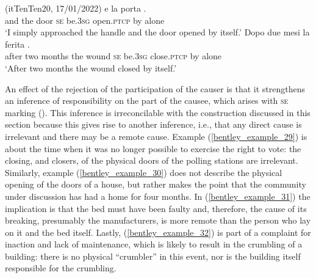 \documentclass[output=paper,colorlinks,citecolor=brown
]{langscibook}
\begin{document}
\hspace*{\fill}(itTenTen20, 17/01/2022)\quad
\ea \label{bentley_example_33}
    \ea \label{bentley_example_33a}
     	e				la		porta														 .	\\
    {} and	the	door		\textsc{se}		be.3\textsc{sg}		open.\textsc{ptcp}	by	alone \\
    \glt 					‘I simply approached the handle and the door opened by itself.’
    \ex \label{bentley_example_33b}
    \gll Dopo		due	mesi			la		ferita			 								 			 . \\
				after			two	months	the	wound		\textsc{se}		be.3\textsc{sg}		close.\textsc{ptcp}	by	alone\\
    \glt 				‘After two months the wound closed by itself.’
    \z
\z

An effect of the rejection of the participation of the causer is that it strengthens an inference of responsibility on the part of the causee, which arises with \textsc{se} marking (\cites[and references therein]{zribi1987reflexivite}[]{kailuweit2012construcciones}[see section \ref{bentley_section_5.4.1} for further discussion]{martin2014anticausatives}). This inference is irreconcilable with the construction discussed in this section because this gives rise to another inference, i.e., that any direct cause is irrelevant and there may be a remote cause. Example (\ref{bentley_example_29}) is about the time when it was no longer possible to exercise the right to vote: the closing, and closers, of the physical doors of the polling stations are irrelevant. Similarly, example (\ref{bentley_example_30}) does not describe the physical opening of the doors of a house, but rather makes the point that the community under discussion has had a home for four months. In (\ref{bentley_example_31}) the implication is that the bed must have been faulty and, therefore, the cause of its breaking, presumably the manufacturers, is more remote than the person who lay on it and the bed itself. Lastly, (\ref{bentley_example_32}) is part of a complaint for inaction and lack of maintenance, which is likely to result in the crumbling of a building: there is no physical “crumbler” in this event, nor is the building itself responsible for the crumbling.
\end{document}
